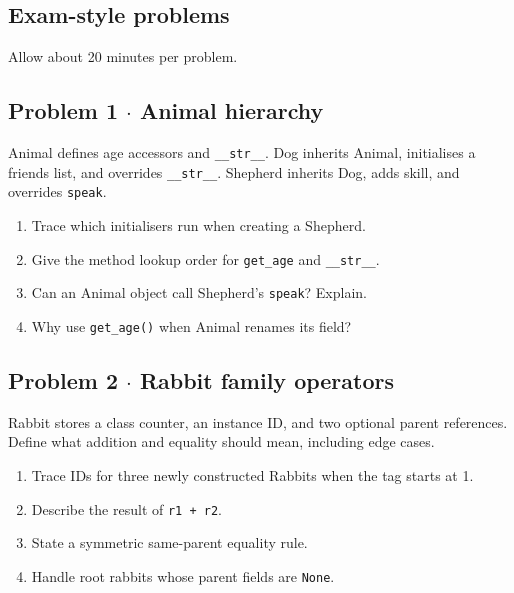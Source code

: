 \documentclass[11pt]{article}
\begin{document}
\begin{keepsection}
\section{Exam-style problems}

Allow about 20 minutes per problem.

\begin{keepsection}
\subsection{Problem 1 \ensuremath{\cdot} Animal hierarchy}

Animal defines age accessors and \texttt{\_\_str\_\_}. Dog inherits Animal, initialises a friends list, and overrides \texttt{\_\_str\_\_}. Shepherd inherits Dog, adds skill, and overrides \texttt{speak}.

\begin{enumerate}
\item Trace which initialisers run when creating a Shepherd.
\item Give the method lookup order for \texttt{get\_age} and \texttt{\_\_str\_\_}.
\item Can an Animal object call Shepherd’s \texttt{speak}? Explain.
\item Why use \texttt{get\_age()} when Animal renames its field?
\end{enumerate}

\end{keepsection}

\begin{keepsection}
\subsection{Problem 2 \ensuremath{\cdot} Rabbit family operators}

Rabbit stores a class counter, an instance ID, and two optional parent references. Define what addition and equality should mean, including edge cases.

\begin{enumerate}
\item Trace IDs for three newly constructed Rabbits when the tag starts at 1.
\item Describe the result of \texttt{r1 + r2}.
\item State a symmetric same-parent equality rule.
\item Handle root rabbits whose parent fields are \texttt{None}.
\end{enumerate}

\end{keepsection}
\end{keepsection}
\end{document}
